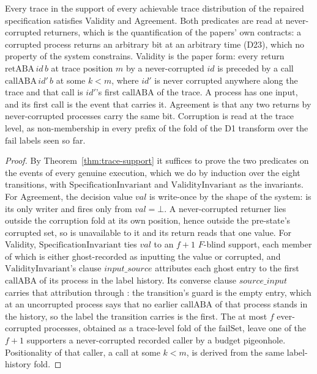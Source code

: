 \begin{theorem}
  \label{thm:aba-spec-safe}
  \leanok
  Every trace in the support of every achievable trace distribution of the repaired specification satisfies Validity and Agreement.\leanok{}\leanok{} Both predicates are read at never-corrupted returners, which is the quantification of the papers' own contracts: a corrupted process returns an arbitrary bit at an arbitrary time (D23), which no property of the system constrains.
  Validity is the paper form: every return $\mathrm{retABA}\,id\,b$ at trace position $m$ by a never-corrupted $id$ is preceded by a call $\mathrm{callABA}\,id'\,b$ at some $k < m$, where $id'$ is never corrupted anywhere along the trace and that call is $id'$'s first $\mathrm{callABA}$ of the trace.
  A process has one input, and its first call is the event that carries it.
  Agreement is that any two returns by never-corrupted processes carry the same bit.
  Corruption is read at the trace level, as non-membership in every prefix of the fold of the D1 transform over the $\mathrm{fail}$ labels seen so far.
\end{theorem}

\begin{proof}\leanok
  By Theorem~\ref{thm:trace-support} it suffices to prove the two predicates on the events of every genuine execution, which we do by induction over the eight transitions, with $\mathrm{SpecificationInvariant}$ and $\mathrm{ValidityInvariant}$ as the invariants.
  For Agreement, the decision value $val$ is write-once by the shape of the system:  is its only writer and fires only from $val = \bot$.
  A never-corrupted returner lies outside the corruption fold at its own position, hence outside the pre-state's corrupted set, so  is unavailable to it and its return reads that one value.
  For Validity, $\mathrm{SpecificationInvariant}$ ties $val$ to an $f{+}1$ $F$-blind support, each member of which is either ghost-recorded as inputting the value or corrupted, and $\mathrm{ValidityInvariant}$'s clause $input\_source$ attributes each ghost entry to the first $\mathrm{callABA}$ of its process in the label history.
  Its converse clause $source\_input$ carries that attribution through : the transition's guard is the empty entry, which at an uncorrupted process says that no earlier $\mathrm{callABA}$ of that process stands in the history, so the label the transition carries is the first.
  The at most $f$ ever-corrupted processes, obtained as a trace-level fold of the $\mathrm{failSet}$, leave one of the $f{+}1$ supporters a never-corrupted recorded caller by a budget pigeonhole.
  Positionality of that caller, a call at some $k < m$, is derived from the same label-history fold.
\end{proof}
